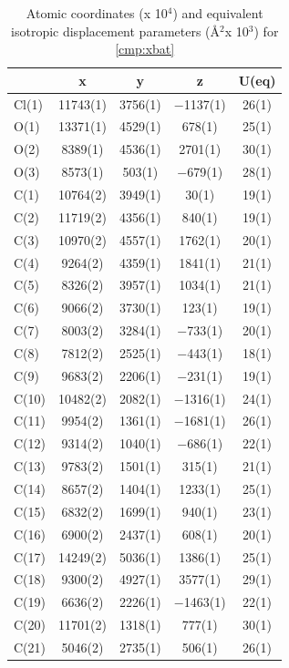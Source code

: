 \twocolumn
\begin{table}[h]
\centering
\caption{Atomic coordinates (x 10$^4$) and equivalent isotropic displacement parameters (\AA$^2$x
10$^3$) for \ref{cmp:xbat}}
{\footnotesize
\begin{tabular}{lcccc} 
\\
\toprule
& x & y & z & U(eq) \\
\midrule
Cl(1)&11743(1)&3756(1)&$-$1137(1)&26(1)\\
O(1)&13371(1)&4529(1)&678(1)&25(1)\\
O(2)&8389(1)&4536(1)&2701(1)&30(1)\\
O(3)&8573(1)&503(1)&$-$679(1)&28(1)\\
C(1)&10764(2)&3949(1)&30(1)&19(1)\\
C(2)&11719(2)&4356(1)&840(1)&19(1)\\
C(3)&10970(2)&4557(1)&1762(1)&20(1)\\
C(4)&9264(2)&4359(1)&1841(1)&21(1)\\
C(5)&8326(2)&3957(1)&1034(1)&21(1)\\
C(6)&9066(2)&3730(1)&123(1)&19(1)\\
C(7)&8003(2)&3284(1)&$-$733(1)&20(1)\\
C(8)&7812(2)&2525(1)&$-$443(1)&18(1)\\
C(9)&9683(2)&2206(1)&$-$231(1)&19(1)\\
C(10)&10482(2)&2082(1)&$-$1316(1)&24(1)\\
C(11)&9954(2)&1361(1)&$-$1681(1)&26(1)\\
C(12)&9314(2)&1040(1)&$-$686(1)&22(1)\\
C(13)&9783(2)&1501(1)&315(1)&21(1)\\
C(14)&8657(2)&1404(1)&1233(1)&25(1)\\
C(15)&6832(2)&1699(1)&940(1)&23(1)\\
C(16)&6900(2)&2437(1)&608(1)&20(1)\\
C(17)&14249(2)&5036(1)&1386(1)&25(1)\\
C(18)&9300(2)&4927(1)&3577(1)&29(1)\\
C(19)&6636(2)&2226(1)&$-$1463(1)&22(1)\\
C(20)&11701(2)&1318(1)&777(1)&30(1)\\
C(21)&5046(2)&2735(1)&506(1)&26(1)\\
\bottomrule
\end{tabular}
}
\end{table} 

